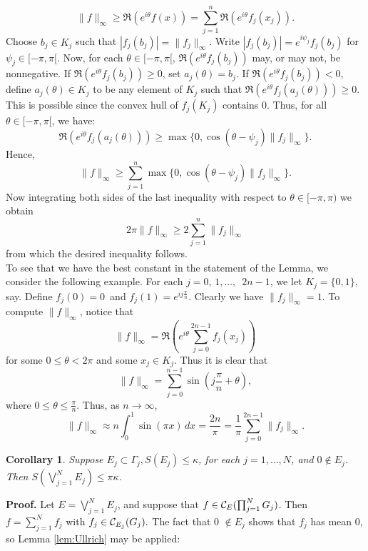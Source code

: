 $$\|f\|_\infty\geq\Re \left( e^{i\theta}f(x)\right)=
\sum_{j=1}^n\Re\left( e^{i\theta}f_j(x_j)\right).$$
Choose $b_j \in K_j$ such that $|f_j(b_j)| = \|f_j\|_\infty$.  Write
$|f_j(b_j)|=e^{i\psi_j}f_j(b_j)$ for $\psi_j\in[-\pi,\pi[$.  Now, for each
$\theta\in[-\pi,\pi[$,
$\Re\left( e^{i\theta}f_j(b_j)\right)$
may, or may not, be nonnegative.  If
$\Re\left( e^{i\theta}f_j(b_j)\right)\geq 0$,
set $a_j(\theta ) = b_j$.  If
$\Re\left( e^{i\theta}f_j(b_j)\right) < 0$, define $a_j(\theta )\in K_j$
to be any element of $K_j$ such that
$\Re\left( e^{i\theta}f_j(a_j(\theta))\right)\geq 0.$
This is possible since the convex hull of $f_j(K_j)$ contains
$0$.  Thus, for all $\theta\in[-\pi,\pi[$, we have:
$$\Re\left( e^{i\theta}f_j(a_j(\theta ))\right)
\geq\max \{0 , \cos (\theta - \psi_j)\|f_j\|_\infty\}.$$
Hence,
$$\|f\|_\infty\geq\sum_{j=1}^n \max \{0 , \cos (\theta -
\psi_j)\|f_j\|_\infty\}.$$
Now integrating both sides of the last inequality with respect to
$\theta\in [-\pi , \pi )$ we obtain
$$2\pi\|f\|_\infty\geq 2\sum_{j=1}^n\|f_j\|_\infty$$
from which the desired inequality follows. \\
To see that we have the best constant in the statement of the Lemma,
we consider the following example.  For each $j = 0$, $1,\ldots,$\ $2n-1$,
we let $K_j = \{0,1\}$, say.  Define $f_j(0) = 0$\ and $f_j(1) = e^{ij\frac
\pi n}$.  Clearly we have $\|f_j\|_\infty = 1$.  To compute
$\| f \|_\infty$, notice that 
$$ \| f \|_\infty = \Re\left(e^{i\theta} \sum_{j=0}^{2n-1} f_j(x_j) \right) $$
for some $0\le \theta < 2\pi$ and some $x_j \in K_j$.  Thus it is clear
that 
$$ \| f \|_\infty = \sum_{j=0}^{n-1} \sin(j\frac\pi n + \theta) ,$$
where $0 \le \theta \le \frac \pi n$.  Thus, as $n \to \infty$, 
$$ \| f \|_\infty \approx n \int_0^1 \sin(\pi x) \,dx
                  =  \frac{2n}\pi
                  =  \frac 1\pi \sum_{j=0}^{2n-1} \| f_j\|_\infty .$$


\newtheorem{Ullrich2}[join]{Corollary}
\begin{Ullrich2}
Suppose $E_j\subset\Gamma_j , S(E_j)\leq\kappa$, for each $j=1, \ldots
, N$, and
$0\notin E_j$.  Then $S\left(\bigvee_{j=1}^N E_j\right) \leq
\pi \kappa$.
\label{cor:Ullrich}
\end{Ullrich2}

{\bf Proof.}  Let $E = \bigvee_{j=1}^N E_j$, and suppose that $f\in
{\cal C}_E(\prod_{j=1}^N G_j)$.  Then $f = \sum_{j=1}^N f_j$ with
$f_j
\in
{\cal C}_{E_j}(G_j).$  The fact that 0 $\notin E_j$ shows that
$f_j$ has mean 0, so Lemma \ref{lem:Ullrich} may be applied:

